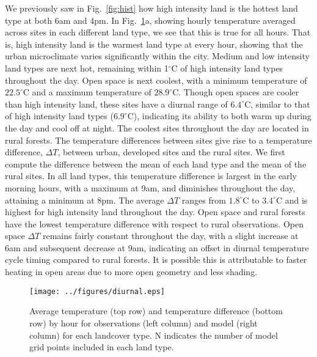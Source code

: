 \documentclass[draft,linenumbers]{agujournal}
\begin{document}
We previously saw in Fig.~\ref{fig:hist} how high intensity land is the hottest land type at both 6am and 4pm.  In Fig.~\ref{fig:diurnal}a, showing hourly temperature averaged across sites in each different land type, we see that this is true for all hours. That is, high intensity land is the warmest land type at every hour, showing that the urban microclimate varies significantly within the city. 
Medium and low intensity land types are next hot, remaining within 1$^\circ$C of high intensity land types throughout the day. Open space is next coolest, with a minimum temperature of $22.5^\circ$C and a maximum temperature of $28.9^\circ$C. 
Though open spaces are cooler than high intensity land, these sites have a diurnal range of $6.4^\circ$C, similar to that of high intensity land types ($6.9^\circ$C), indicating its ability to both warm up during the day and cool off at night. 
The coolest sites throughout the day are located in rural forests. 
The temperature differences between sites give rise to a temperature difference, $\Delta T$, between urban, developed sites and the rural sites. We first compute the difference between the mean of each land type and the mean of the rural sites. 
In all land types, this temperature difference is largest in the early morning hours, with a maximum at 9am, and diminishes throughout the day, attaining a minimum at 8pm. The average $\Delta T$ ranges from $1.8^\circ$C to $3.4^\circ$C
and is highest for high intensity land throughout the day. Open space and rural forests have the lowest temperature difference with respect to rural observations. Open space $\Delta T$ remains fairly constant throughout the day, with a slight increase at 6am and subsequent decrease at 9am, indicating an offset in diurnal temperature cycle timing compared to rural forests. It is possible this is attributable to faster heating in open areas due to more open geometry and less shading. 

\begin{figure}[h]
\centering
\texttt{[image: ../figures/diurnal.eps]}
\caption{Average temperature (top row) and temperature difference (bottom row) by hour for observations (left column) and model (right column) for each landcover type. N indicates the number of model grid points included in each land type. }
\label{fig:diurnal}
\end{figure}
\end{document}
